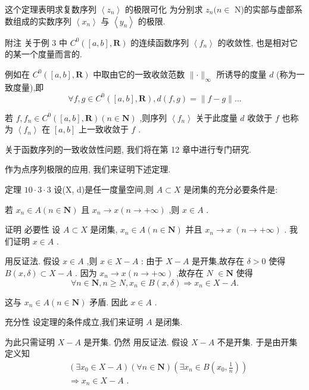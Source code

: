 这个定理表明求复数序列 $\left\langle  {z}_{n}\right\rangle$ 的极限可化 为分别求 ${z}_{n}(n \in$ N)的实部与虚部系数组成的实数序列 $\left\langle  {x}_{n}\right\rangle$ 与 $\left\langle  {y}_{n}\right\rangle$ 的极限.

附注 关于例 3 中 ${C}^{0}\left( {\left\lbrack  {a,b}\right\rbrack  ,\mathbf{R}}\right)$ 的连续函数序列 $\left\langle  {f}_{n}\right\rangle$ 的收敛性, 也是相对它的某一个度量而言的.

例如在 ${C}^{0}\left( {\left\lbrack  {a,b}\right\rbrack  ,\mathbf{R}}\right)$ 中取由它的一致收敛范数 $\parallel  \cdot  {\parallel }_{\infty }$ 所诱导的度量 $d$ (称为一致度量),即
$$\forall f,g \in  {C}^{0}\left( {\left\lbrack  {a,b}\right\rbrack  ,\mathbf{R}}\right) ,d\left( {f,g}\right)  = \parallel f - g\parallel \ldots$$

若 $f,{f}_{n} \in  {C}^{0}\left( {\left\lbrack  {a,b}\right\rbrack  ,\mathbf{R}}\right) \left( {n \in  \mathbf{N}}\right)$ ,则序列 $\left\langle  {f}_{n}\right\rangle$ 关于此度量 $d$ 收敛于 $f$ 也称为 $\left\langle  {f}_{n}\right\rangle$ 在 $\left\lbrack  {a,b}\right\rbrack$ 上一致收敛于 $f$ .

关于函数序列的一致收敛性问题, 我们将在第 12 章中进行专门研究.

作为点序列极限的应用, 我们来证明下述定理.

定理 ${10} \cdot  3 \cdot  3$ 设(X, d)是任一度量空间,则 $A \subset  X$ 是闭集的充分必要条件是:

若 ${x}_{n} \in  A\left( {n \in  \mathbf{N}}\right)$ 且 ${x}_{n} \rightarrow  x\left( {n \rightarrow   + \infty }\right)$ ,则 $x \in  A$ .

证明 必要性 设 $A \subset  X$ 是闭集, ${x}_{n} \in  A\left( {n \in  \mathbf{N}}\right)$ 并且 ${x}_{n} \rightarrow  x$  $\left( {n \rightarrow   + \infty }\right)$ . 我们证明 $x \in  A$ .

用反证法. 假设 $x \in  A$ ,则 $x \in  X - A$ : 由于 $X - A$ 是开集,故存在 $\delta  > 0$ 使得 $B\left( {x,\delta }\right)  \subset  X - A$ . 因为 ${x}_{n} \rightarrow  x\left( {n \rightarrow   + \infty }\right)$ ,故存在 $N$  $\in  \mathbf{N}$ 使得
$$\forall n \in  \mathbf{N},n \geq  N,{x}_{n} \in  B\left( {x,\delta }\right)  \Rightarrow  {x}_{n} \in  X - A.$$

这与 ${x}_{n} \in  A\left( {n \in  \mathbf{N}}\right)$ 矛盾. 因此 $x \in  A$ .

充分性 设定理的条件成立,我们来证明 $A$ 是闭集.

为此只需证明 $X - A$ 是开集. 仍然 用反证法. 假设 $X - A$ 不是开集. 于是由开集定义知
\begin{align*}
	&\left( {\exists {x}_{0} \in  X - A}\right) \left( {\forall n \in  \mathbf{N}}\right) \left( {\exists {x}_{n} \in  B\left( {{x}_{0},\frac{1}{n}}\right) }\right)\\
	&\Rightarrow  {x}_{n} \in  X - A\text{ . }
\end{align*}


